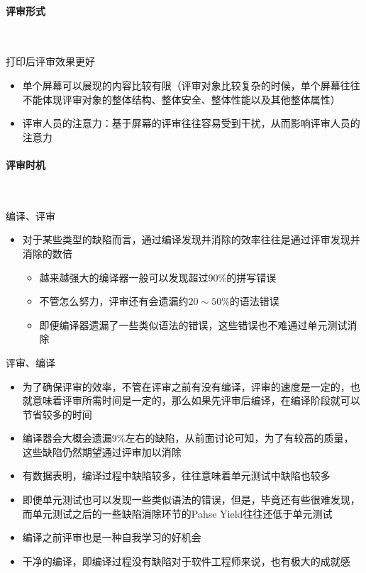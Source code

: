 \begin{figure}[H]
{\begin{minipage}[c]{0.44\linewidth}
	\end{minipage}
	}
	\centering
\end{figure}

\paragraph{评审形式}~{} \par
打印后评审效果更好
\begin{itemize}
    \item 单个屏幕可以展现的内容比较有限（评审对象比较复杂的时候，单个屏幕往往不能体现评审对象的整体结构、整体安全、整体性能以及其他整体属性）
    \item 评审人员的注意力：基于屏幕的评审往往容易受到干扰，从而影响评审人员的注意力
\end{itemize}

\paragraph{评审时机}~{} \par
编译、评审
\begin{itemize}
    \item 对于某些类型的缺陷而言，通过编译发现并消除的效率往往是通过评审发现并消除的数倍
    \begin{itemize}
        \item 越来越强大的编译器一般可以发现超过90\%的拼写错误
        \item 不管怎么努力，评审还有会遗漏约$20\sim 50$\%的语法错误
        \item 即便编译器遗漏了一些类似语法的错误，这些错误也不难通过单元测试消除
    \end{itemize}
\end{itemize}

评审、编译
\begin{itemize}
    \item 为了确保评审的效率，不管在评审之前有没有编译，评审的速度是一定的，也就意味着评审所需时间是一定的，那么如果先评审后编译，在编译阶段就可以节省较多的时间
    \item 编译器会大概会遗漏9\%左右的缺陷，从前面讨论可知，为了有较高的质量，这些缺陷仍然期望通过评审加以消除
    \item 有数据表明，编译过程中缺陷较多，往往意味着单元测试中缺陷也较多
    \item 即便单元测试也可以发现一些类似语法的错误，但是，毕竟还有些很难发现，而单元测试之后的一些缺陷消除环节的Pahse Yield往往还低于单元测试
    \item 编译之前评审也是一种自我学习的好机会
    \item 干净的编译，即编译过程没有缺陷对于软件工程师来说，也有极大的成就感
\end{itemize}

